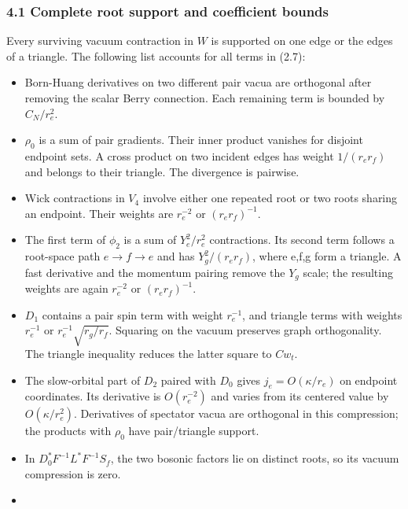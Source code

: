 \subsubsection{4.1 Complete root support and coefficient
bounds}\label{d-complete-root-support-and-coefficient-bounds}

Every surviving vacuum contraction in \(W\) is supported on one edge or
the edges of a triangle. The following list accounts for all terms in
(2.7):

\begin{itemize}
\tightlist
\item
  Born-Huang derivatives on two different pair vacua are orthogonal
  after removing the scalar Berry connection. Each remaining term is
  bounded by \(C_{N}/r_{e}^{2}\).
\item
  \(\rho _{0}\) is a sum of pair gradients. Their inner product vanishes
  for disjoint endpoint sets. A cross product on two incident edges has
  weight \(1/(r_{e} r_{f})\) and belongs to their triangle. The
  divergence is pairwise.
\item
  Wick contractions in \(V_{4}\) involve either one repeated root or two
  roots sharing an endpoint. Their weights are \(r_{e}^{-2}\) or
  \((r_{e} r_{f})^{-1}\).
\item
  The first term of \(\phi _{2}\) is a sum of \(Y_{e}^{2}/r_{e}^{2}\)
  contractions. Its second term follows a root-space path
  \(e \to  f \to  e\) and has \(Y_{g}^{2}/(r_{e} r_{f})\), where e,f,g
  form a triangle. A fast derivative and the momentum pairing remove the
  \(Y_{g}\) scale; the resulting weights are again \(r_{e}^{-2}\) or
  \((r_{e} r_{f})^{-1}\).
\item
  \(D_{1}\) contains a pair spin term with weight \(r_{e}^{-1}\), and
  triangle terms with weights \(r_{e}^{-1}\) or
  \(r_{e}^{-1} \sqrt{r_{g}/r_{f}}\). Squaring on the vacuum preserves
  graph orthogonality. The triangle inequality reduces the latter square
  to \(C w_{t}\).
\item
  The slow-orbital part of \(D_{2}\) paired with \(D_{0}\) gives
  \(j_{e}=O(\kappa /r_{e})\) on endpoint coordinates. Its derivative is
  \(O(r_{e}^{-2})\) and varies from its centered value by
  \(O(\kappa /r_{e}^{2})\). Derivatives of spectator vacua are
  orthogonal in this compression; the products with \(\rho _{0}\) have
  pair/triangle support.
\item
  In \(D_{0}^{*}F^{-1}L^{*}F^{-1} S_{f}\), the two bosonic factors lie
  on distinct roots, so its vacuum compression is zero.
\item

\end{itemize}
